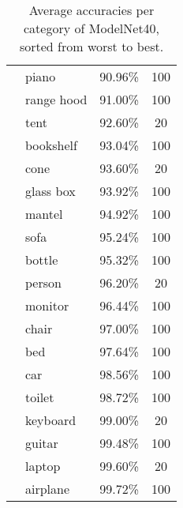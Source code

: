 \begin{table}[]
\begin{tabular}[t]{llcc}
		             & piano             & 90.96\%           & 100            \\
		             & range hood        & 91.00\%           & 100            \\
		             & tent              & 92.60\%           & 20             \\
		             & bookshelf         & 93.04\%           & 100            \\
		             & cone              & 93.60\%           & 20             \\
		             & glass box         & 93.92\%           & 100            \\
		             & mantel            & 94.92\%           & 100            \\
		             & sofa              & 95.24\%           & 100            \\
		             & bottle            & 95.32\%           & 100            \\
		             & person            & 96.20\%           & 20             \\
		             & monitor           & 96.44\%           & 100            \\
		             & chair             & 97.00\%           & 100            \\
		             & bed               & 97.64\%           & 100            \\
		             & car               & 98.56\%           & 100            \\
		             & toilet            & 98.72\%           & 100            \\
		             & keyboard          & 99.00\%           & 20             \\
		             & guitar            & 99.48\%           & 100            \\
		             & laptop            & 99.60\%           & 20             \\
		             & airplane          & 99.72\%           & 100            \\ \hline
	\end{tabular}
	
	
	\caption{Average accuracies per category of ModelNet40, sorted from worst to best.}
	\label{Table:cataccuracies}
\end{table}